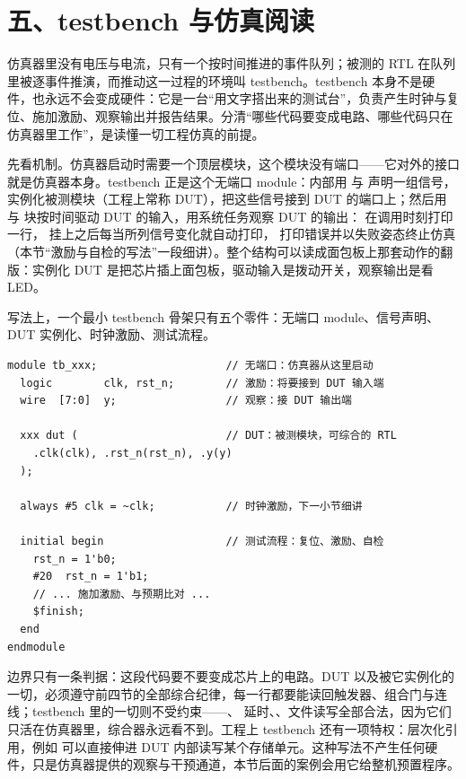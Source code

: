 \section{五、testbench 与仿真阅读}

仿真器里没有电压与电流，只有一个按时间推进的事件队列；被测的 RTL 在队列里被逐事件推演，而推动这一过程的环境叫 testbench。testbench 本身不是硬件，也永远不会变成硬件：它是一台“用文字搭出来的测试台”，负责产生时钟与复位、施加激励、观察输出并报告结果。分清“哪些代码要变成电路、哪些代码只在仿真器里工作”，是读懂一切工程仿真的前提。

先看机制。仿真器启动时需要一个顶层模块，这个模块没有端口——它对外的接口就是仿真器本身。testbench 正是这个无端口 module：内部用  与  声明一组信号，实例化被测模块（工程上常称 DUT），把这些信号接到 DUT 的端口上；然后用  与  块按时间驱动 DUT 的输入，用系统任务观察 DUT 的输出： 在调用时刻打印一行， 挂上之后每当所列信号变化就自动打印， 打印错误并以失败姿态终止仿真（本节“激励与自检的写法”一段细讲）。整个结构可以读成面包板上那套动作的翻版：实例化 DUT 是把芯片插上面包板，驱动输入是拨动开关，观察输出是看 LED。

写法上，一个最小 testbench 骨架只有五个零件：无端口 module、信号声明、DUT 实例化、时钟激励、测试流程。

\begin{lstlisting}
module tb_xxx;                    // 无端口：仿真器从这里启动
  logic        clk, rst_n;        // 激励：将要接到 DUT 输入端
  wire  [7:0]  y;                 // 观察：接 DUT 输出端

  xxx dut (                       // DUT：被测模块，可综合的 RTL
    .clk(clk), .rst_n(rst_n), .y(y)
  );

  always #5 clk = ~clk;           // 时钟激励，下一小节细讲

  initial begin                   // 测试流程：复位、激励、自检
    rst_n = 1'b0;
    #20  rst_n = 1'b1;
    // ... 施加激励、与预期比对 ...
    $finish;
  end
endmodule
\end{lstlisting}

边界只有一条判据：这段代码要不要变成芯片上的电路。DUT 以及被它实例化的一切，必须遵守前四节的全部综合纪律，每一行都要能读回触发器、组合门与连线；testbench 里的一切则不受约束——、\code{\#} 延时、、文件读写全部合法，因为它们只活在仿真器里，综合器永远看不到。工程上 testbench 还有一项特权：层次化引用，例如  可以直接伸进 DUT 内部读写某个存储单元。这种写法不产生任何硬件，只是仿真器提供的观察与干预通道，本节后面的案例会用它给整机预置程序。

